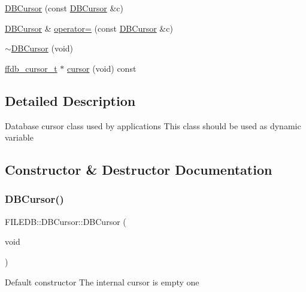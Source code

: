 \begin{DoxyCompactItemize}
\item 
\mbox{\hyperlink{classFILEDB_1_1DBCursor_ae65ab90dc14febbbfa277bfd0e1533db}{D\+B\+Cursor}} (const \mbox{\hyperlink{classFILEDB_1_1DBCursor}{D\+B\+Cursor}} \&c)
\item 
\mbox{\hyperlink{classFILEDB_1_1DBCursor}{D\+B\+Cursor}} \& \mbox{\hyperlink{classFILEDB_1_1DBCursor_a56fbc2127b869d0cfbac2de11f90efd8}{operator=}} (const \mbox{\hyperlink{classFILEDB_1_1DBCursor}{D\+B\+Cursor}} \&c)
\item 
\mbox{\hyperlink{classFILEDB_1_1DBCursor_a8c6c1bdf4c4279ab3e0d980e800c3542}{$\sim$\+D\+B\+Cursor}} (void)
\item 
\mbox{\hyperlink{other__libs_2filedb_2filehash_2ffdb__db_8h_a1383f6fb3966b0ca74206ba93b687fd9}{ffdb\+\_\+cursor\+\_\+t}} $\ast$ \mbox{\hyperlink{classFILEDB_1_1DBCursor_a9e5b4a386c6f27bc1eb67714117e1e6d}{cursor}} (void) const
\end{DoxyCompactItemize}


\subsection{Detailed Description}
Database cursor class used by applications This class should be used as dynamic variable 

\subsection{Constructor \& Destructor Documentation}
\mbox{\label{classFILEDB_1_1DBCursor_aba0d95e9eb892acd1722ca46e481459d}} 
\subsubsection{\texorpdfstring{DBCursor()}{DBCursor()}\hspace{0.1cm}{\footnotesize\ttfamily [1/6]}}
{\footnotesize\ttfamily F\+I\+L\+E\+D\+B\+::\+D\+B\+Cursor\+::\+D\+B\+Cursor (\begin{DoxyParamCaption}\item[{void}]{ }\end{DoxyParamCaption})}

Default constructor The internal cursor is empty one \mbox{\label{classFILEDB_1_1DBCursor_aaa004d2a0c3ddb6b8df9f31600c29a3b}} 
